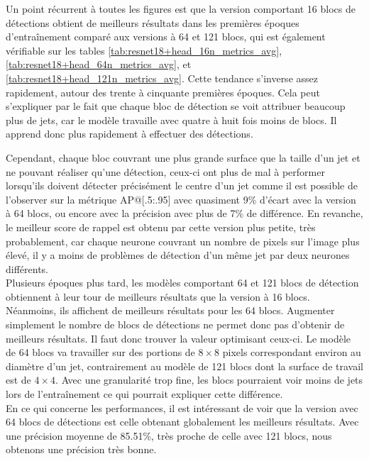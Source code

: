 \break

Un point récurrent à toutes les figures est que la version comportant 16 blocs de détections obtient de meilleurs résultats dans les premières époques d'entraînement comparé aux versions à 64 et 121 blocs, qui est également vérifiable sur les tables \ref{tab:resnet18+head_16n_metrics_avg}, \ref{tab:resnet18+head_64n_metrics_avg}, et \ref{tab:resnet18+head_121n_metrics_avg}. Cette tendance s'inverse assez rapidement, autour des trente à cinquante premières époques. Cela peut s'expliquer par le fait que chaque bloc de détection se voit attribuer beaucoup plus de jets, car le modèle travaille avec quatre à huit fois moins de blocs. Il apprend donc plus rapidement à effectuer des détections.

Cependant, chaque bloc couvrant une plus grande surface que la taille d'un jet et ne pouvant réaliser qu'une détection, ceux-ci ont plus de mal à performer lorsqu'ils doivent détecter précisément le centre d'un jet comme il est possible de l'observer sur la métrique AP@[.5:.95] avec quasiment 9\% d'écart avec la version à 64 blocs, ou encore avec la précision avec plus de 7\% de différence. En revanche, le meilleur score de rappel est obtenu par cette version plus petite, très probablement, car chaque neurone couvrant un nombre de pixels sur l'image plus élevé, il y a moins de problèmes de détection d'un même jet par deux neurones différents.\\

Plusieurs époques plus tard, les modèles comportant 64 et 121 blocs de détection obtiennent à leur tour de meilleurs résultats que la version à 16 blocs. Néanmoins, ils affichent de meilleurs résultats pour les 64 blocs. Augmenter simplement le nombre de blocs de détections ne permet donc pas d'obtenir de meilleurs résultats. Il faut donc trouver la valeur optimisant ceux-ci. Le modèle de 64 blocs va travailler sur des portions de $8 \times 8$ pixels correspondant environ au diamètre d'un jet, contrairement au modèle de 121 blocs dont la surface de travail est de $4 \times 4$. Avec une granularité trop fine, les blocs pourraient voir moins de jets lors de l'entraînement ce qui pourrait expliquer cette différence.\\

En ce qui concerne les performances, il est intéressant de voir que la version avec 64 blocs de détections est celle obtenant globalement les meilleurs résultats. Avec une précision moyenne de 85.51\%, très proche de celle avec 121 blocs, nous obtenons une précision très bonne. 

